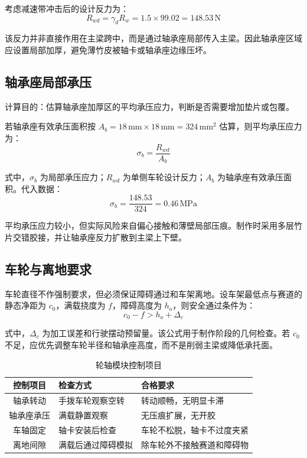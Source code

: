 \documentclass[UTF8,a4paper,12pt,fontset=none]{ctexart}
\numberwithin{equation}{section}
\numberwithin{figure}{section}
\numberwithin{table}{section}
\newcommand{\mm}{\,\mathrm{mm}}
\newcommand{\Nunit}{\,\mathrm{N}}
\newcommand{\MPa}{\,\mathrm{MPa}}
\begin{document}
考虑减速带冲击后的设计反力为：
\begin{equation}
  R_{wd}=\gamma_dR_w=1.5\times99.02=148.53\Nunit
\end{equation}

该反力并非直接作用在主梁跨中，而是通过轴承座局部传入主梁。因此轴承座区域应设置局部加厚，避免薄竹皮被轴卡或轴承座边缘压坏。

\subsection{轴承座局部承压}
计算目的：估算轴承座加厚区的平均承压应力，判断是否需要增加垫片或包覆。

若轴承座有效承压面积按 $A_b=18\mm\times18\mm=324\mm^2$ 估算，则平均承压应力为：
\begin{equation}
  \sigma_b=\frac{R_{wd}}{A_b}
\end{equation}

式中，$\sigma_b$ 为局部承压应力；$R_{wd}$ 为单侧车轮设计反力；$A_b$ 为轴承座有效承压面积。代入数据：
\begin{equation}
  \sigma_b=\frac{148.53}{324}=0.46\MPa
\end{equation}

平均承压应力较小，但实际风险来自偏心接触和薄壁局部压痕。制作时采用多层竹片交错胶接，并让轴承座反力扩散到主梁上下壁。

\subsection{车轮与离地要求}
车轮直径不作强制要求，但必须保证障碍通过和车架离地。设车架最低点与赛道的静态净距为 $c_0$，满载挠度为 $f$，障碍高度为 $h_o$，则安全通过条件为：
\begin{equation}
  c_0-f>h_o+\Delta_c
\end{equation}

式中，$\Delta_c$ 为加工误差和行驶摆动预留量。该公式用于制作阶段的几何检查。若 $c_0$ 不足，应优先调整车轮半径和轴承座高度，而不是削弱主梁或降低承托面。

\begin{table}[H]
\centering
\caption{轮轴模块控制项目}
\label{tab:wheel-control}
\begin{tabularx}{\linewidth}{cY Y}
\toprule
控制项目 & 检查方式 & 合格要求 \\
\midrule
轴承转动 & 手拨车轮观察空转 & 转动顺畅，无明显卡滞 \\
轴承座承压 & 满载静置观察 & 无压痕扩展，无开胶 \\
车轴固定 & 轴卡安装后检查 & 车轮不松脱，轴卡不过度夹紧 \\
离地间隙 & 满载后通过障碍模拟 & 除车轮外不接触赛道和障碍物 \\
\bottomrule
\end{tabularx}
\end{table}
\end{document}
